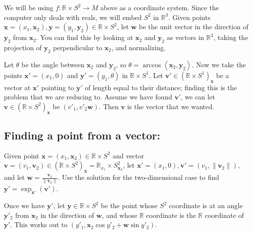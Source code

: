 \bigskip

We will be using $f:\mathbb{R} \times S^2 \to M$ above as a coordinate system. Since the computer only deals with reals, we will embed $S^2$ in $\mathbb{R}^3$. Given points $\textbf{x} = (x_1, \textbf{x}_2), \textbf{y} = (y_1, \textbf{y}_2) \in \mathbb{R} \times S^2$, let $\textbf{w}$ be the unit vector in the direction of $\textbf{y}_2$ from $\textbf{x}_2$. You can find this by looking at $\textbf{x}_2$ and $\textbf{y}_2$ as vectors in $\mathbb{R}^3$, taking the projection of $\textbf{y}_2$ perpendicular to $\textbf{x}_2$, and normalizing.

Let $\theta$ be the angle between $\textbf{x}_2$ and $\textbf{y}_2$, so $\theta = \arccos\left<\textbf{x}_2,\textbf{y}_2\right>$. Now we take the points $\textbf{x}' = (x_1, 0)$ and $\textbf{y}' = (y_1, \theta)$ in $\mathbb{R} \times S^1$. Let $\textbf{v}' \in (\mathbb{R} \times S^1)_\textbf{x}$ be a vector at $\textbf{x}'$ pointing to $\textbf{y}'$ of length equal to their distance; finding this is the problem that we are reducing to. Assume we have found $\textbf{v}'$, we can let $\textbf{v} \in (\mathbb{R} \times S^2)_\textbf{x}$ be $(v'_1, v'_2\textbf{w})$. Then $\textbf{v}$ is the vector that we wanted.



\bigskip

\subsection{Finding a point from a vector:}

\bigskip

Given point $\textbf{x} = (x_1, \textbf{x}_2) \in \mathbb{R} \times S^2$ and vector $\textbf{v} = (v_1, \textbf{v}_2) \in (\mathbb{R} \times S^2)_\textbf{x} = \mathbb{R}_{x_1} \times S^2_{\textbf{x}_2}$, let $\textbf{x}' = (x_1,0), \textbf{v}' = (v_1,\|\textbf{v}_2\|)$, and let $\textbf{w} = \frac{\textbf{v}_2}{\|\textbf{v}_2\|}$. Use the solution for the two-dimensional case to find $\textbf{y}' = \exp_{\textbf{x}'}(\textbf{v}')$.


Once we have $\textbf{y}'$, let $\textbf{y} \in \mathbb{R} \times S^2$ be the point whose $S^2$ coordinate is at an angle $\textbf{y}'_2$ from $\textbf{x}_2$ in the direction of $\textbf{w}$, and whose $\mathbb{R}$ coordinate is the $\mathbb{R}$ coordinate of $\textbf{y}'$. This works out to $(y'_1, \textbf{x}_2\cos y'_2+\textbf{w}\sin y'_2)$.

